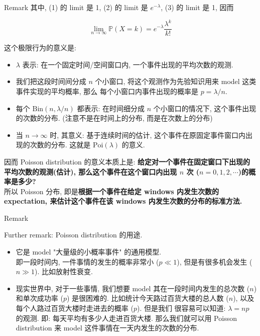 \documentclass{qlnotes-export}
\begin{document}
\begin{example}
\begin{qlremark}{Remark}
其中, (1) 的 limit 是 1, (2) 的 limit 是 \(e^{- \lambda}\), (3) 的 limit 是 1, 因而

\[\lim\limits_{n\rightarrow\infty}{\mathbb{P}}(X = k) = e^{- \lambda}\frac{\lambda^{k}}{k!}\]

这个极限行为的意义是:

\begin{itemize}
\item
  \(\lambda\) 表示: 在一个固定时间/空间窗口内, 一个事件出现的平均次数的观测.
\item
  我们把这段时间间分成 \(n\) 个小窗口, 将这个观测作为先验知识用来 model 这类事件实现的平均概率, 那么 每个小窗口内事件出现的概率是 \(p = \lambda/n\).
\item
  每个 \(\text{Bin}(n,\lambda/n)\) 都表示: 在时间细分成 \(n\) 个小窗口的情况下, 这个事件出现的次数的分布. (注意不是在时间上的分布, 而是在次数上的分布)
\item
  当 \(n\rightarrow\infty\) 时, 其意义: 基于连续时间的估计, 这个事件在原固定事件窗口内出现的次数的分布. 这就是 \(\text{Poi}(\lambda)\) 的意义.
\end{itemize}

因而 Poisson distribution 的意义本质上是: \textbf{给定对一个事件在固定窗口下出现的平均次数的观测(估计), 那么这个事件在这个窗口内出现 \(n\) 次 (\(n = 0,1,2,\cdots\))的概率是多少?}\\
所以 Poisson 分布, 即是\textbf{根据一个事件在给定 windows 内发生次数的 expectation, 来估计这个事件在该 windows 内发生次数的分布的标准方法.}\\

\end{qlremark}

\begin{qlremark}{Remark}

Further remark: Poisson distribution 的用途.

\begin{itemize}
\item
  它是 model "大量级的小概率事件" 的通用模型.\\
  即一段时间内, 一件事情的发生的概率非常小 (\(p \ll 1\)), 但是有很多机会发生 (\(n \gg 1\)). 比如放射性衰变.
\item
  现实世界中, 对于一些事情, 我们想要 model 其在一段时间内发生的总次数 (\(n\)) 和单次成功率 (\(p\)) 是很困难的. 比如统计今天路过百货大楼的总人数 (\(n\)), 以及每个人路过百货大楼时走进去的概率 (\(p\)). 但是我们 很容易可以知道: \(\lambda = np\) 的观测. 即: 每天平均有多少人走进百货大楼. 那么我们就可以用 Poisson distribution 来 model 这件事情在一天内发生的次数的分布.\\
\end{itemize}

\end{qlremark}

\end{example}
\end{document}
